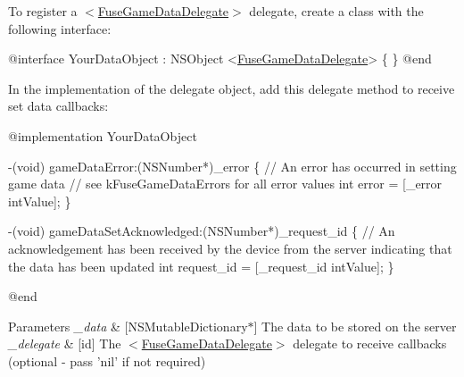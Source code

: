 To register a $<$\hyperlink{protocol_fuse_game_data_delegate-p}{Fuse\+Game\+Data\+Delegate}$>$ delegate, create a class with the following interface\+:


\begin{DoxyCode}
\textcolor{keyword}{@interface }YourDataObject : NSObject <\hyperlink{protocol_fuse_game_data_delegate-p}{FuseGameDataDelegate}> 
\{
\}
\textcolor{keyword}{@end}
\end{DoxyCode}


In the implementation of the delegate object, add this delegate method to receive set data callbacks\+:


\begin{DoxyCode}
\textcolor{keyword}{@implementation }YourDataObject

-(void) gameDataError:(NSNumber*)\_error
\{
   \textcolor{comment}{// An error has occurred in setting game data}
   \textcolor{comment}{// see kFuseGameDataErrors for all error values}
   \textcolor{keywordtype}{int} error = [\_error intValue];
\}

-(void) gameDataSetAcknowledged:(NSNumber*)\_request\_id
\{
   \textcolor{comment}{// An acknowledgement has been received by the device from the server indicating that the data has been
       updated}
   \textcolor{keywordtype}{int} request\_id = [\_request\_id intValue];
\}

\textcolor{keyword}{@end}
\end{DoxyCode}



\begin{DoxyParams}{Parameters}
{\em \+\_\+data} & \mbox{[}N\+S\+Mutable\+Dictionary$\ast$\mbox{]} The data to be stored on the server \\
\hline
{\em \+\_\+delegate} & \mbox{[}id\mbox{]} The $<$\hyperlink{protocol_fuse_game_data_delegate-p}{Fuse\+Game\+Data\+Delegate}$>$ delegate to receive callbacks (optional -\/ pass 'nil' if not required) \\
\hline
\end{DoxyParams}

